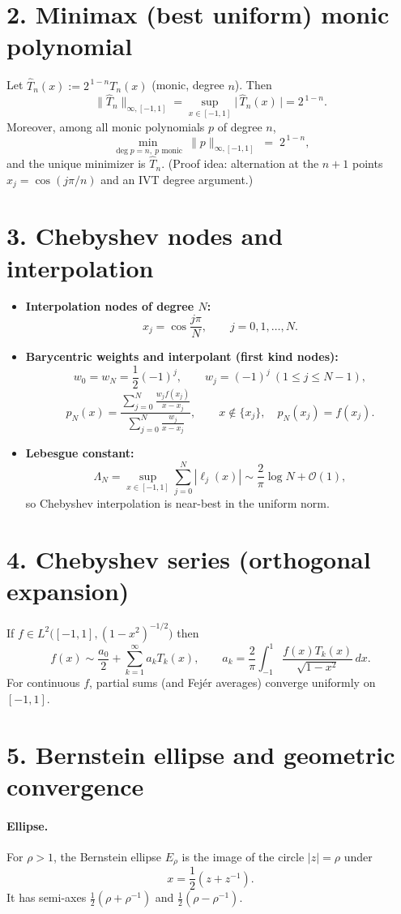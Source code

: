 \documentclass[11pt,a4paper]{article}
\theoremstyle{definition}
\theoremstyle{definition}
\theoremstyle{plain}
\theoremstyle{remark}
\begin{document}
\section*{2. Minimax (best uniform) monic polynomial}
Let $\widehat T_n(x):=2^{\,1-n}T_n(x)$ (monic, degree $n$). Then
\[
\big\|\widehat T_n\big\|_{\infty,[-1,1]}=\sup_{x\in[-1,1]}\big|\,\widehat T_n(x)\,\big|=2^{\,1-n}.
\]
Moreover, among all monic polynomials $p$ of degree $n$,
\[
\min_{\deg p=n,\ p\text{ monic}}\ \|p\|_{\infty,[-1,1]} \;=\; 2^{\,1-n},
\]
and the unique minimizer is $\widehat T_n$. (Proof idea: alternation at the $n\!+\!1$ points 
$x_j=\cos(j\pi/n)$ and an IVT degree argument.)

\section*{3. Chebyshev nodes and interpolation}
\begin{itemize}[leftmargin=*]
	\item \textbf{Interpolation nodes of degree $N$:}
	\[
	x_j=\cos\frac{j\pi}{N},\qquad j=0,1,\dots,N.
	\]
	\item \textbf{Barycentric weights and interpolant (first kind nodes):}
	\[
	w_0=w_N=\frac12(-1)^j,\qquad w_j=(-1)^j\ (1\le j\le N-1),
	\]
	\[
	p_N(x)=\frac{\displaystyle\sum_{j=0}^{N}\frac{w_j f(x_j)}{x-x_j}}
	{\displaystyle\sum_{j=0}^{N}\frac{w_j}{x-x_j}},\qquad x\notin\{x_j\},\quad p_N(x_j)=f(x_j).
	\]
	\item \textbf{Lebesgue constant:} 
	\[
	\Lambda_N=\sup_{x\in[-1,1]}\sum_{j=0}^N |\ell_j(x)| 
	\sim \frac{2}{\pi}\log N + \mathcal O(1),
	\]
	so Chebyshev interpolation is near-best in the uniform norm.
\end{itemize}

\section*{4. Chebyshev series (orthogonal expansion)}
If $f\in L^2\!\big([-1,1],(1-x^2)^{-1/2}\big)$ then
\[
f(x)\sim \frac{a_0}{2}+\sum_{k=1}^{\infty} a_k T_k(x),\qquad
a_k=\frac{2}{\pi}\int_{-1}^{1}\frac{f(x)T_k(x)}{\sqrt{1-x^2}}\,dx.
\]
For continuous $f$, partial sums (and Fej\'er averages) converge uniformly on $[-1,1]$.

\section*{5. Bernstein ellipse and geometric convergence}
\paragraph{Ellipse.} For $\rho>1$, the Bernstein ellipse $E_\rho$ is the image of the circle $|z|=\rho$ under
\[
x=\frac12\left(z+z^{-1}\right).
\]
It has semi-axes $\frac12(\rho+\rho^{-1})$ and $\frac12(\rho-\rho^{-1})$.
\end{document}
